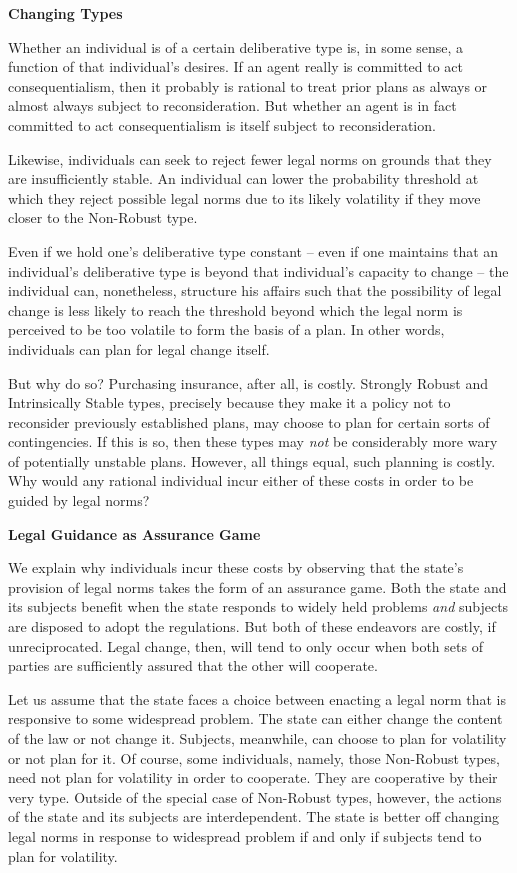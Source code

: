 \textbf{Changing Types}

Whether an individual is of a certain deliberative type is, in some
sense, a function of that individual's desires. If an agent really is
committed to act consequentialism, then it probably is rational to treat
prior plans as always or almost always subject to reconsideration. But
whether an agent is in fact committed to act consequentialism is itself
subject to reconsideration.

Likewise, individuals can seek to reject fewer legal norms on grounds
that they are insufficiently stable. An individual can lower the
probability threshold at which they reject possible legal norms due to
its likely volatility if they move closer to the Non-Robust type.

Even if we hold one's deliberative type constant -- even if one
maintains that an individual's deliberative type is beyond that
individual's capacity to change -- the individual can, nonetheless,
structure his affairs such that the possibility of legal change is less
likely to reach the threshold beyond which the legal norm is perceived
to be too volatile to form the basis of a plan. In other words,
individuals can plan for legal change itself.

But why do so? Purchasing insurance, after all, is costly. Strongly
Robust and Intrinsically Stable types, precisely because they make it a
policy not to reconsider previously established plans, may choose to
plan for certain sorts of contingencies. If this is so, then these types
may \emph{not} be considerably more wary of potentially unstable plans.
However, all things equal, such planning is costly. Why would any
rational individual incur either of these costs in order to be guided by
legal norms?

\textbf{Legal Guidance as Assurance Game}

We explain why individuals incur these costs by observing that the
state's provision of legal norms takes the form of an assurance game.
Both the state and its subjects benefit when the state responds to
widely held problems \emph{and} subjects are disposed to adopt the
regulations. But both of these endeavors are costly, if unreciprocated.
Legal change, then, will tend to only occur when both sets of parties
are sufficiently assured that the other will cooperate.

Let us assume that the state faces a choice between enacting a legal
norm that is responsive to some widespread problem. The state can either
change the content of the law or not change it. Subjects, meanwhile, can
choose to plan for volatility or not plan for it. Of course, some
individuals, namely, those Non-Robust types, need not plan for
volatility in order to cooperate. They are cooperative by their very
type. Outside of the special case of Non-Robust types, however, the
actions of the state and its subjects are interdependent. The state is
better off changing legal norms in response to widespread problem if and
only if subjects tend to plan for volatility.

